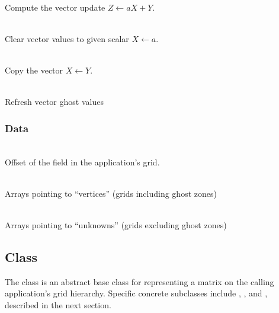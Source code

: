 \documentclass[11pt]{article}
\begin{document}
     \\
    Compute the vector update $Z \leftarrow a X + Y$. 

     \\
    Clear vector values to given scalar $X \leftarrow a$.

     \\
    Copy the vector $X \leftarrow Y$.

     \\
    Refresh vector ghost values

\subsubsection{ Data}

     \\
    Offset of the field in the application's grid.

     \\
    Arrays pointing to ``vertices'' (grids including ghost zones)

     \\
    Arrays pointing to ``unknowns'' (grids excluding ghost zones)

\subsection{ Class} \label{s:matrix}

   The  class is an abstract base class for representing
   a matrix on the calling application's grid hierarchy.  Specific
   concrete subclasses include , , and
   , described in the next section.

   \umlMatrix
\end{document}
